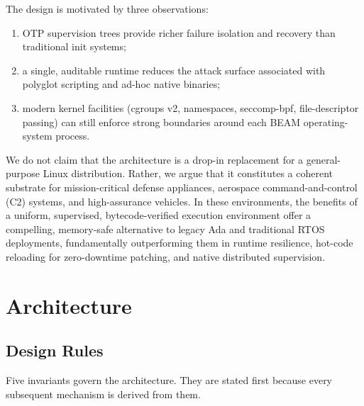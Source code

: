 \documentclass{article}
\begin{document}
The design is motivated by three observations:
\begin{enumerate}[nosep]
  \item OTP supervision trees provide richer failure isolation and recovery than traditional init systems;
  \item a single, auditable runtime reduces the attack surface associated with polyglot scripting and ad-hoc native binaries;
  \item modern kernel facilities (cgroups v2, namespaces, seccomp-bpf, file-descriptor passing) can still enforce strong boundaries around each BEAM operating-system process.
\end{enumerate}

We do not claim that the architecture is a drop-in replacement for a general-purpose Linux distribution.
Rather, we argue that it constitutes a coherent substrate for mission-critical defense appliances, aerospace command-and-control (C2) systems, and high-assurance vehicles. In these environments, the benefits of a uniform, supervised, bytecode-verified execution environment offer a compelling, memory-safe alternative to legacy Ada and traditional RTOS deployments, fundamentally outperforming them in runtime resilience, hot-code reloading for zero-downtime patching, and native distributed supervision.

\section{Architecture}

\subsection{Design Rules}

Five invariants govern the architecture.
They are stated first because every subsequent mechanism is derived from them.
\end{document}
